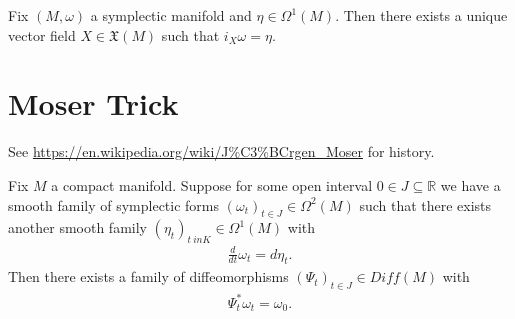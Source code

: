 
\begin{proposition} \label{propisom} \cite{ybaehn}
Fix $(M,\omega)$ a symplectic manifold and $\eta \in \Omega^1(M)$. Then there exists a unique vector field $X \in \mathfrak{X}(M)$ such that $i_X \omega = \eta$.
\end{proposition}

\section{Moser Trick}

\begin{remark}
See \url{https://en.wikipedia.org/wiki/J%C3%BCrgen_Moser} for history.
\end{remark}

\begin{theorem}\label{mostr} \cite{salamon}
Fix $M$ a compact manifold. Suppose for some open interval $0 \in J \subseteq \mathbb{R}$ we have a smooth family of symplectic forms $(\omega_t)_{t \in J} \in \Omega^2(M)$ such that there exists another smooth family $(\eta_t)_{t \ in K} \in \Omega^1(M)$ with
\begin{align*}
\frac{d}{dt} \omega_t = d\eta_t.
\end{align*}
Then there exists a family of diffeomorphisms $(\Psi_t)_{t \in J} \in Diff(M)$ with
\begin{align*}
\Psi^*_t \omega_t = \omega_0.
\end{align*}
\end{theorem}

